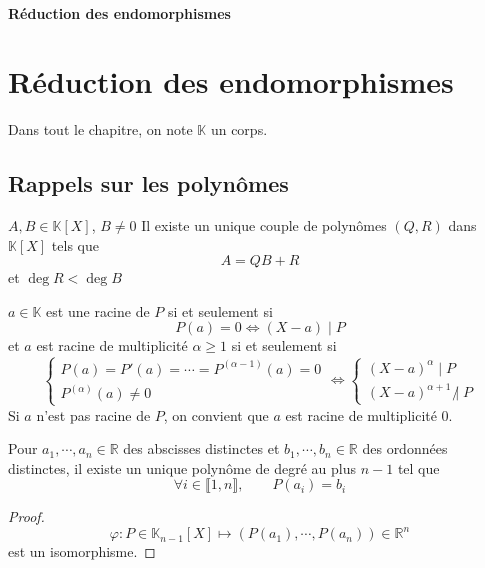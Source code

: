 \ifsolo
    ~

    \vspace{1cm}

    \begin{center}
        \textbf{\LARGE Réduction des endomorphismes} \\[1em]
    \end{center}
    \tableofcontents
\else
    \chapter{Réduction des endomorphismes}

    \minitoc
\fi
\thispagestyle{empty}

\ifsolo \newpage \setcounter{page}{1} \fi

Dans tout le chapitre, on note $\mathbb K$ un corps.

\section{Rappels sur les polynômes}

\begin{thm}
    \Hyp $A, B\in \mathbb K[X]$, $B\neq 0$
    \Conc Il existe un unique couple de polynômes $(Q, R)$ dans $\mathbb K[X]$ tels que \[
        A=QB+R
    \]
    et $\deg R<\deg B$
\end{thm}

\begin{thmdef}
    $a\in\mathbb K$ est une racine de $P$ si et seulement si \[
    P(a)=0\iff (X-a)\;|\;P
\]
et $a$ est racine de multiplicité $\alpha \geq 1$ si et seulement si \[
    \begin{cases}
        P(a)=P'(a)=\cdots=P^{(\alpha - 1)}(a)=0 \\
        P^{(\alpha)}(a)\neq 0
    \end{cases}
    \iff \begin{cases}
        (X-a)^\alpha \; |\; P\\
        (X-a)^{\alpha+1}\;\not|\;P
    \end{cases}
\]
Si $a$ n'est pas racine de $P$, on convient que $a$ est racine de multiplicité $0$.
\end{thmdef}

\begin{thm}
     Pour $a_1, \cdots, a_n\in\mathbb R$ des abscisses distinctes et $b_1, \cdots, b_n\in\mathbb R$ des ordonnées distinctes, il existe un unique polynôme de degré au plus $n-1$ tel que \[
        \forall i\in\llbracket 1, n\rrbracket, \qquad P(a_i)=b_i
    \]
\end{thm}
\begin{proof}
    \[
        \varphi:P\in\mathbb K_{n-1}[X]\longmapsto (P(a_1), \cdots, P(a_n))\in\mathbb R^n
    \]
    est un isomorphisme.
\end{proof}

